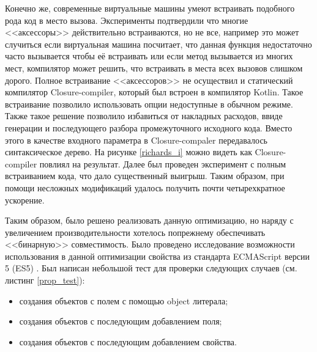 Конечно же, современные виртуальные машины умеют встраивать подобного рода код в место вызова. Эксперименты подтвердили что многие <<аксессоры>> действительно встраиваются, но не все, например это может случиться если виртуальная машина посчитает, что данная функция недостаточно часто вызывается чтобы её встраивать или если метод вызывается из многих мест, компилятор может решить, что встраивать в места всех вызовов слишком дорого. 
Полное встраивание <<аксессоров>> не осуществил и статический компилятор Closure-compiler, который был встроен в компилятор Kotlin. Такое встраивание позволило использовать опции недоступные в обычном режиме. Также такое решение позволило избавиться от накладных расходов, ввиде генерации и последующего разбора промежуточного исходного кода. Вместо этого в качестве входного параметра в Closure-compaler передавалось синтаксическое дерево. На рисунке \ref{richards_i} можно видеть как Closure-compiler повлиял на результат.
Далее был проведен эксперимент с полным встраиванием кода, что дало существенный выигрыш. Таким образом, при помощи несложных модификаций удалось получить почти четырехкратное ускорение. 

\begin{code}
\end{code}

Таким образом, было решено реализовать данную оптимизацию, но наряду с увеличением производительности хотелось попрежнему обеспечивать <<бинарную>> совместимость. Было проведено исследование возможности использования в данной оптимизации свойства из стандарта ECMAScript версии 5 (ES5) \cite{ES5}. Был написан небольшой тест для проверки следующих случаев (см. листинг \ref{prop_test}):
\begin{itemize}
	\item создания объектов с полем с помощью object литерала;
	\item создания объектов с последующим добавлением поля;
	\item создания объектов с последующим добавлением свойства.
\end{itemize}

